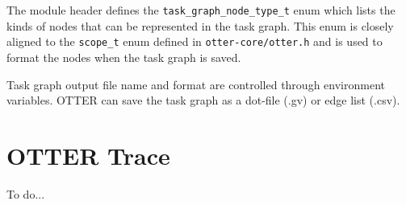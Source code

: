 \documentclass[11pt,a4paper]{article}
\newcommand{\code}[1]{\texttt{#1} }
\begin{document}
The module header defines the \code{task\_graph\_node\_type\_t} enum which lists the kinds of nodes that can be represented in the task graph. This enum is closely aligned to the \code{scope\_t} enum defined in \code{otter-core/otter.h} and is used to format the nodes when the task graph is saved.

Task graph output file name and format are controlled through environment variables. OTTER can save the task graph as a dot-file (.gv) or edge list (.csv).

\section{OTTER Trace}

To do...
\end{document}
